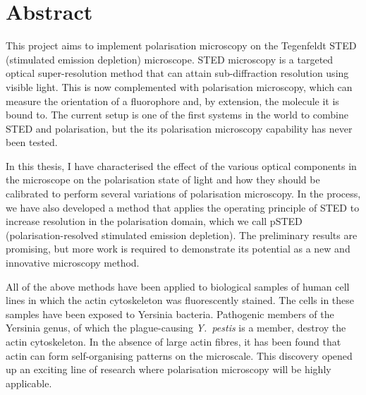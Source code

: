 \chapter{Abstract}

This project aims to implement polarisation microscopy on the Tegenfeldt STED (stimulated emission depletion) microscope. STED microscopy is a targeted optical super-resolution method that can attain sub-diffraction resolution using visible light. This is now complemented with polarisation microscopy, which can measure the orientation of a fluorophore and, by extension, the molecule it is bound to. The current setup is one of the first systems in the world to combine STED and polarisation, but the its polarisation microscopy capability has never been tested.

In this thesis, I have characterised the effect of the various optical components in the microscope on the polarisation state of light and how they should be calibrated to perform several variations of polarisation microscopy. In the process, we have also developed a method that applies the operating principle of STED to increase resolution in the polarisation domain, which we call pSTED (polarisation-resolved stimulated emission depletion). The preliminary results are promising, but more work is required to demonstrate its potential as a new and innovative microscopy method.

All of the above methods have been applied to biological samples of human cell lines in which the actin cytoskeleton was fluorescently stained. The cells in these samples have been exposed to Yersinia bacteria. Pathogenic members of the Yersinia genus, of which the plague-causing \emph{Y.~pestis} is a member, destroy the actin cytoskeleton. In the absence of large actin fibres, it has been found that actin can form self-organising patterns on the microscale. This discovery opened up an exciting line of research where polarisation microscopy will be highly applicable.